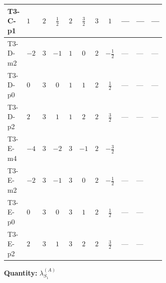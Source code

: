 \documentclass[8pt]{article}
\begin{document}
\begin{landscape}
\begin{longtable}{@{}llcccccc >{\raggedright\arraybackslash}p{0.21\linewidth} >{\raggedright\arraybackslash}p{0.21\linewidth} >{\raggedright\arraybackslash}p{0.21\linewidth}@{}}
\midrule
T3-C-p1 & $1$ & $2$ & $\frac{1}{2}$ & $2$ & $\frac{3}{2}$ & $3$ & $1$ & --- & --- & --- \\
\midrule
T3-D-m2 & $-2$ & $3$ & $-1$ & $1$ & $0$ & $2$ & $-\frac{1}{2}$ & --- & --- & --- \\
\midrule
T3-D-p0 & $0$ & $3$ & $0$ & $1$ & $1$ & $2$ & $\frac{1}{2}$ & --- & --- & --- \\
\midrule
T3-D-p2 & $2$ & $3$ & $1$ & $1$ & $2$ & $2$ & $\frac{3}{2}$ & --- & --- & --- \\
\midrule
T3-E-m4 & $-4$ & $3$ & $-2$ & $3$ & $-1$ & $2$ & $-\frac{3}{2}$ & \scriptsize\adjustbox{max width=\linewidth}{$\begin{gathered} +{g_1}^2 \left(36 {g_2}^2-6 {\lambda_{S_1}^{(1)}}-48 {\lambda_{S_1}^{(A)}}\right)\end{gathered}$} & \scriptsize\adjustbox{max width=\linewidth}{$\begin{gathered} +24 {g_1}^4\end{gathered}$} & \scriptsize\adjustbox{max width=\linewidth}{$\begin{gathered} +\frac{3 {\lambda_{12}^{(1)}}^2}{4}\end{gathered}$} \\
\midrule
T3-E-m2 & $-2$ & $3$ & $-1$ & $3$ & $0$ & $2$ & $-\frac{1}{2}$ & --- & --- & \scriptsize\adjustbox{max width=\linewidth}{$\begin{gathered} +\frac{3 {\lambda_{12}^{(1)}}^2}{4}\end{gathered}$} \\
\midrule
T3-E-p0 & $0$ & $3$ & $0$ & $3$ & $1$ & $2$ & $\frac{1}{2}$ & --- & --- & \scriptsize\adjustbox{max width=\linewidth}{$\begin{gathered} +\frac{3 {\lambda_{12}^{(1)}}^2}{4}\end{gathered}$} \\
\midrule
T3-E-p2 & $2$ & $3$ & $1$ & $3$ & $2$ & $2$ & $\frac{3}{2}$ & --- & --- & \scriptsize\adjustbox{max width=\linewidth}{$\begin{gathered} +\frac{3 {\lambda_{12}^{(1)}}^2}{4}\end{gathered}$} \\
\midrule
\bottomrule
\end{longtable}
\clearpage
\noindent\textbf{Quantity: }$\lambda_{S_1}^{(A)}$\par\smallskip

\end{landscape}
\end{document}
